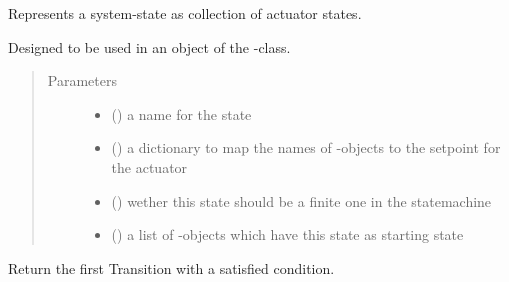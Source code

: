 \documentclass[a4paper,12pt,english]{article}
\begin{document}
\begin{fulllineitems}
\label{\detokenize{osbk_operation:osbk_operation.utility.State}}
Represents a system-state as collection of actuator states.

Designed to be used in an object of the -class.
\begin{quote}\begin{description}
\item[{Parameters}] \leavevmode\begin{itemize}
\item {} 
 () \textendash{} a name for the state

\item {} 
 () \textendash{} a dictionary to map the names of -objects to the
setpoint for the actuator

\item {} 
 () \textendash{} wether this state should be a finite one in the statemachine

\item {} 
 (\sphinxstyleliteralemphasis{\sphinxupquote{{[}}}{\hyperref[\detokenize{osbk_operation:osbk_operation.utility.Transition}]{\sphinxcrossref{\sphinxstyleliteralemphasis{\sphinxupquote{Transition}}}}}\sphinxstyleliteralemphasis{\sphinxupquote{{]}}}) \textendash{} a list of -objects which have this state as starting
state

\end{itemize}

\end{description}\end{quote}

\begin{fulllineitems}
\label{\detokenize{osbk_operation:osbk_operation.utility.State.check_exit_conditions}}
Return the first Transition with a satisfied condition.

\end{fulllineitems}


\end{fulllineitems}
\end{document}
